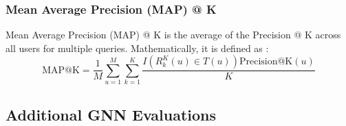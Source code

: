 \documentclass{article}
\begin{document}
\subsubsection{Mean Average Precision (MAP) @ K}

Mean Average Precision (MAP) @ K is the average of the Precision @ K across all users for multiple queries. Mathematically, it is defined as \cite{survey}:
$$
\mbox{MAP@K} = \frac{1}{M} \sum_{u = 1}^M \sum_{k = 1}^K \frac{I(R^K_k(u) \in T(u)) \mbox{Precision@K}(u)}{K}
$$



\subsection{Additional GNN Evaluations} \label{additional-gnn-eval}
\end{document}
